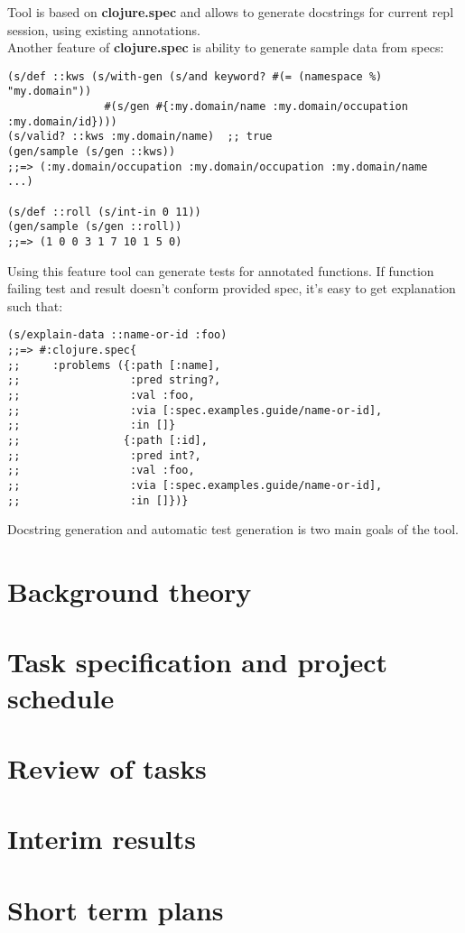 \documentclass[12pt,a4paper]{report}
\begin{document}
Tool is based on \textbf{clojure.spec} and allows to generate docstrings for current
repl session, using existing annotations. \\

Another feature of \textbf{clojure.spec} is ability to generate sample data from
specs:

\begin{verbatim}
(s/def ::kws (s/with-gen (s/and keyword? #(= (namespace %) "my.domain"))
               #(s/gen #{:my.domain/name :my.domain/occupation :my.domain/id})))
(s/valid? ::kws :my.domain/name)  ;; true
(gen/sample (s/gen ::kws))
;;=> (:my.domain/occupation :my.domain/occupation :my.domain/name  ...)

(s/def ::roll (s/int-in 0 11))
(gen/sample (s/gen ::roll))
;;=> (1 0 0 3 1 7 10 1 5 0)
\end{verbatim}

Using this feature tool can generate tests for annotated functions. If function
failing test and result doesn't conform provided spec, it's easy to get
explanation such that:

\begin{verbatim}
(s/explain-data ::name-or-id :foo)
;;=> #:clojure.spec{
;;     :problems ({:path [:name],
;;                 :pred string?,
;;                 :val :foo,
;;                 :via [:spec.examples.guide/name-or-id],
;;                 :in []}
;;                {:path [:id],
;;                 :pred int?,
;;                 :val :foo,
;;                 :via [:spec.examples.guide/name-or-id],
;;                 :in []})}
\end{verbatim}

Docstring generation and automatic test generation is two main goals of the tool.

\section*{Background theory}
\section*{Task specification and project schedule}
\section*{Review of tasks}
\section*{Interim results}
\section*{Short term plans}
\end{document}
